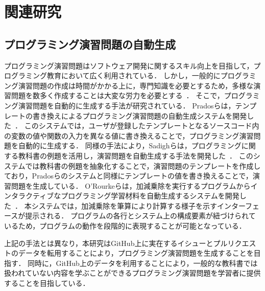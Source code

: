 \chapter{関連研究}
\graphicspath{{Chapter2/Figs/}}

%
%
\section{プログラミング演習問題の自動生成}
プログラミング演習問題はソフトウェア開発に関するスキル向上を目指して，プログラミング教育において広く利用されている．
しかし，一般的にプログラミング演習問題の作成は時間がかかる上に，専門知識を必要とするため，多様な演習問題を数多く作成することは大変な労力を必要とする~\cite{Guo_Codeopticon}．
そこで，プログラミング演習問題を自動的に生成する手法が研究されている．
Pradosらは，テンプレートの書き換えによるプログラミング演習問題の自動生成システムを開発した~\cite{prados_automatic_exercise_generation}．
このシステムでは，ユーザが登録したテンプレートとなるソースコード内の変数の値や関数の入力を異なる値に書き換えることで，プログラミング演習問題を自動的に生成する．
同様の手法により，Sadighらは，プログラミングに関する教科書の例題を活用し，演習問題を自動生成する手法を開発した~\cite{Sadigh_automatic_exercise_generation}．
このシステムでは教科書の例題を抽象化することで，演習問題のテンプレートを作成しており，Pradosらのシステムと同様にテンプレートの値を書き換えることで，演習問題を生成している．
O'Rourkeらは，加減乗除を実行するプログラムからインタラクティブなプログラミング学習材料を自動生成するシステムを開発した~\cite{O'Rourke_Scaffolding_CHI15}．
本システムでは，加減乗除を筆算により計算する様子を示すインターフェースが提示される．
プログラムの各行とシステム上の構成要素が紐づけられているため，プログラムの動作を段階的に表現することが可能となっている．

上記の手法とは異なり，本研究はGitHub上に実在するイシューとプルリクエストのデータを転用することにより，プログラミング演習問題を生成することを目指す．
同時に，GitHub上のデータを利用することにより，一般的な教科書では扱われていない内容を学ぶことができるプログラミング演習問題を学習者に提供することを目指している．





